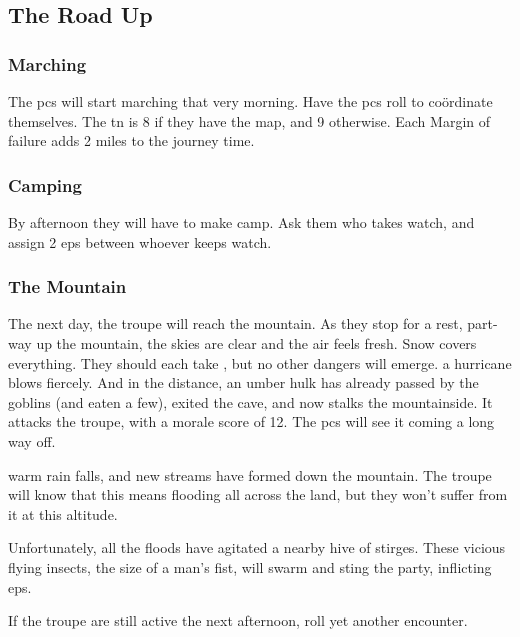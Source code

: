\begin{multicols}{2}
\glsresetall

\subsection{The Road Up}

\subsubsection{Marching}
The \glspl{pc} will start marching that very morning.
Have the \glspl{pc} roll  to co\"{o}rdinate themselves.
The \gls{tn} is 8 if they have the map, and 9 otherwise.
Each Margin of failure adds 2 miles to the journey time.%

\subsubsection{Camping}
By afternoon they will have to make camp.
Ask them who takes watch, and assign 2 \glspl{ep} between whoever keeps watch.

\subsubsection{The Mountain}
The next day, the troupe will reach the mountain.
As they stop for a rest, part-way up the mountain,
\ifcase\value{temperature}
  the skies are clear and the air feels fresh.
  Snow covers everything.
  They should each take , but no other dangers will emerge.
  \or
  a hurricane blows fiercely.
  And in the distance, an umber hulk has already passed by the goblins (and eaten a few), exited the cave, and now stalks the mountainside.
  It attacks the troupe, with a morale score of 12.
  The \glspl{pc} will see it coming a long way off.

  \umberhulk
  \else
  warm rain falls, and new streams have formed down the mountain.
  The troupe will know that this means flooding all across the land, but they won't suffer from it at this altitude.

  Unfortunately, all the floods have agitated a nearby hive of stirges.
  These vicious flying insects, the size of a man's fist, will swarm%
  and sting the party, inflicting \glspl{ep}.%

  \stirgeSwarm
\fi

If the troupe are still active the next afternoon, roll yet another encounter.%


\end{multicols}
